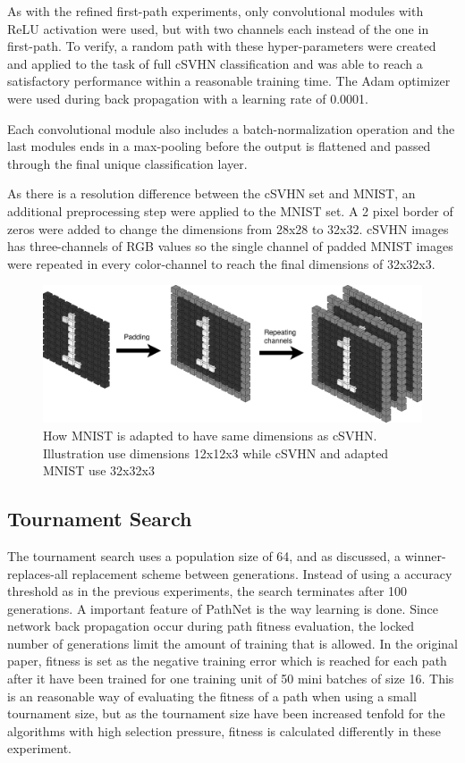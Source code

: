 As with the refined first-path experiments, only convolutional modules with ReLU activation were used, but with two channels each instead of the one in first-path. To verify, a random path with these hyper-parameters were created and applied to the task of full cSVHN classification and was able to reach a satisfactory performance within a reasonable training time. The Adam optimizer were used during back propagation with a learning rate of 0.0001. 

Each convolutional module also includes a batch-normalization operation and the last modules ends in a max-pooling before the output is flattened and passed through the final unique classification layer. 

As there is a resolution difference between the cSVHN set and MNIST, an additional preprocessing step were applied to the MNIST set. A 2 pixel border of zeros were added to change the dimensions from 28x28 to 32x32. cSVHN images has three-channels of RGB values so the single channel of padded MNIST images were repeated in every color-channel to reach the final dimensions of 32x32x3.  

\begin{figure}[h]
    \includegraphics[width=\textwidth]{Chapters/Experiments/search_algo/figures/MNISTpadding+repeating.png}
    \caption{How MNIST is adapted to have same dimensions as cSVHN. Illustration use dimensions 12x12x3 while cSVHN and adapted MNIST use 32x32x3}
    \label{fig:MNISTpadding}
\end{figure}

\subsection{Tournament Search}
The tournament search uses a population size of 64, and as discussed, a winner-replaces-all replacement scheme between generations. Instead of using a accuracy threshold as in the previous experiments, the search terminates after 100 generations. A important feature of PathNet is the way learning is done. Since network back propagation occur during path fitness evaluation, the locked number of generations limit the amount of training that is allowed. In the original paper, fitness is set as the negative training error which is reached for each path after it have been trained for one training unit of 50 mini batches of size 16. This is an reasonable way of evaluating the fitness of a path when using a small tournament size, but as the tournament size have been increased tenfold for the algorithms with high selection pressure, fitness is calculated differently in these experiment. 

